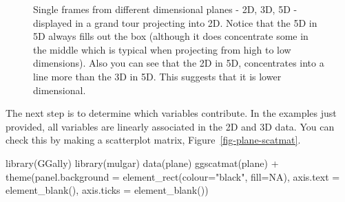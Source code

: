 \documentclass[
  letterpaper,
]{krantz}
\newenvironment{Shaded}{\begin{snugshade}}{\end{snugshade}}
\newcommand{\AttributeTok}[1]{\textcolor[rgb]{0.40,0.45,0.13}{#1}}
\newcommand{\ConstantTok}[1]{\textcolor[rgb]{0.56,0.35,0.01}{#1}}
\newcommand{\FunctionTok}[1]{\textcolor[rgb]{0.28,0.35,0.67}{#1}}
\newcommand{\NormalTok}[1]{\textcolor[rgb]{0.00,0.23,0.31}{#1}}
\newcommand{\SpecialCharTok}[1]{\textcolor[rgb]{0.37,0.37,0.37}{#1}}
\newcommand{\StringTok}[1]{\textcolor[rgb]{0.13,0.47,0.30}{#1}}
\begin{document}
\begin{figure}
\begin{minipage}{0.33\linewidth}
{}


\end{minipage}%

\caption{\label{fig-dimension-pdf}Single frames from different
dimensional planes - 2D, 3D, 5D - displayed in a grand tour projecting
into 2D. Notice that the 5D in 5D always fills out the box (although it
does concentrate some in the middle which is typical when projecting
from high to low dimensions). Also you can see that the 2D in 5D,
concentrates into a line more than the 3D in 5D. This suggests that it
is lower dimensional. }

\end{figure}%

The next step is to determine which variables contribute. In the
examples just provided, all variables are linearly associated in the 2D
and 3D data. You can check this by making a scatterplot matrix,
Figure~\ref{fig-plane-scatmat}.

\begin{Shaded}
\begin{Highlighting}[]
\FunctionTok{library}\NormalTok{(GGally)}
\FunctionTok{library}\NormalTok{(mulgar)}
\FunctionTok{data}\NormalTok{(plane)}
\FunctionTok{ggscatmat}\NormalTok{(plane) }\SpecialCharTok{+}
  \FunctionTok{theme}\NormalTok{(}\AttributeTok{panel.background =} 
          \FunctionTok{element\_rect}\NormalTok{(}\AttributeTok{colour=}\StringTok{"black"}\NormalTok{, }\AttributeTok{fill=}\ConstantTok{NA}\NormalTok{),}
    \AttributeTok{axis.text =} \FunctionTok{element\_blank}\NormalTok{(),}
    \AttributeTok{axis.ticks =} \FunctionTok{element\_blank}\NormalTok{())}
\end{Highlighting}
\end{Shaded}
\end{document}
